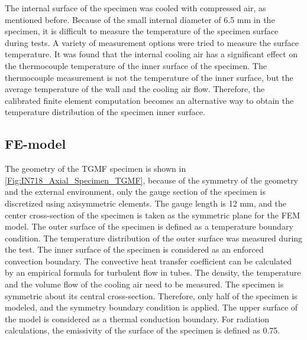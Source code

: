 \documentclass[preprint,5p,twocolumn,10pt,sort&compress]{elsarticle}
\begin{document}
The internal surface of the specimen was cooled with compressed air, as mentioned before.
Because of the small internal diameter of 6.5 mm in the specimen, it is difficult to measure the temperature of the specimen surface during tests. 
A variety of measurement options were tried to measure the surface temperature.
It was found that the internal cooling air has a significant effect on the thermocouple temperature of the inner surface of the specimen.
The thermocouple measurement is not the temperature of the inner surface, but the average temperature of the wall and the cooling air flow.
Therefore, the calibrated finite element computation becomes an alternative way to obtain the temperature distribution of the specimen inner surface.

\subsection{FE-model}

The geometry of the TGMF specimen is shown in \autoref{Fig:IN718_Axial_Specimen_TGMF}, because of the symmetry of the geometry and the external environment, only the gauge section of the specimen is discretized using axisymmetric elements. The gauge length is 12 mm, and the center cross-section of the specimen is taken as the symmetric plane for the FEM model. 
The outer surface of the specimen is defined as a temperature boundary condition. The temperature distribution of the outer surface was measured during the test. The inner surface of the specimen is considered as an enforced convection boundary. The convective heat transfer coefficient can be calculated by an empirical formula for turbulent flow in tubes. The density, the temperature and the volume flow of the cooling air need to be measured. The specimen is symmetric about its central cross-section. Therefore, only half of the specimen is modeled, and the symmetry boundary condition is applied. The upper surface of the model is considered as a thermal conduction boundary. For radiation calculations, the emissivity of the surface of the specimen is defined as 0.75.

\end{document}
